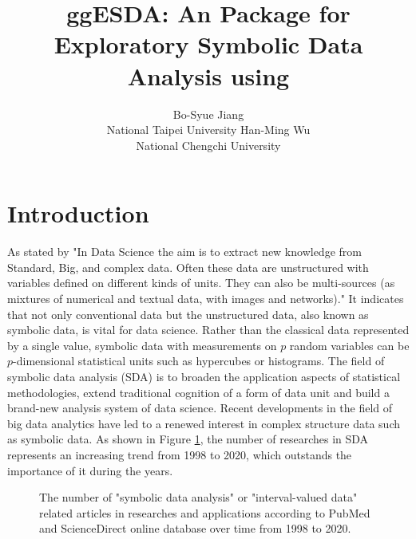 \documentclass[article]{jss}
\author{Bo-Syue Jiang\\National Taipei University
\And Han-Ming Wu\\National Chengchi University}
\title{ggESDA: An \proglang{R} Package for Exploratory Symbolic Data Analysis using \pkg{ggplot2}}
\newcommand{\imgdir}{../../../paperImage/}
\begin{document}
\section{Introduction}
As stated by \cite{Diday:2018} "In Data Science the aim is to extract new knowledge from Standard, Big, and complex data. Often these data are unstructured with variables defined on different kinds of units. They can also be multi-sources (as mixtures of numerical and textual data, with images and networks)." It indicates that not only conventional data but the unstructured data, also known as symbolic data, is vital for data science. Rather than the classical data represented by a single value, symbolic data with measurements on $p$ random variables can be $p$-dimensional statistical units such as hypercubes or histograms. The field of symbolic data analysis (SDA) \cite{Billard+Diday:2007} is to broaden the application aspects of statistical methodologies, extend traditional cognition of a form of data unit and build a brand-new analysis system of data science. Recent developments in the field of big data analytics have led to a renewed interest in complex structure data such as symbolic data. As shown in Figure \ref{fig:trend}, the number of researches in SDA represents an increasing trend from 1998 to 2020, which outstands the importance of it during the years.

\begin{figure}[htbp]	

  		\centering	 			
  		\caption{The number of "symbolic data analysis" or "interval-valued data" related articles in researches and applications according to PubMed and ScienceDirect online database over time from 1998 to 2020.}   		
  		\label{fig:trend}   			 		 
\end{figure}
\end{document}
